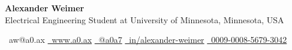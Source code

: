 \documentclass[11pt, a4]{russell}
\begin{document}
\begin{center}
\Large{\textbf{Alexander Weimer}} \\
\vspace{0.5em}
\small{Electrical Engineering Student at University of Minnesota, Minnesota, USA} \\
\vspace{0.8em}

\small{
  \raisebox{-0.1ex}{}~aw@a0.ax
  \quad
  \href{https://a0.ax/}{\raisebox{-0.4ex}{}~www.a0.ax}
  \quad
  \href{https://github.com/a0a7}{\raisebox{-0.5ex}{}~@a0a7}
  \quad
  \href{https://linkedin.com/in/alexander-weimer}{\raisebox{-0.2em}{}~in/alexander-weimer}
  \quad
  \href{https://orcid.org/0009-0008-5679-3042}{\raisebox{-0.1em}{}~0009-0008-5679-3042}
}

\vspace{0.8em}
\end{center}

    
    
    
    
    
    


\vspace*{\fill}
\end{document}
